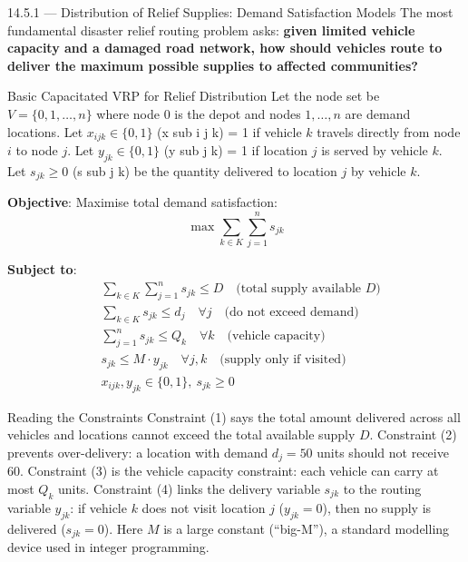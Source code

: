 \documentclass[aspectratio=169,10pt]{beamer}
\begin{document}
\begin{frame}[allowframebreaks]{14.5.1 --- Distribution of Relief Supplies: Demand Satisfaction Models}
  The most fundamental disaster relief routing problem asks:
  \textbf{given limited vehicle capacity and a damaged road network,
  how should vehicles route to deliver the maximum possible supplies
  to affected communities?}

  \medskip
  \begin{block}{Basic Capacitated VRP for Relief Distribution}
    Let the node set be $V = \{0, 1, \ldots, n\}$ where node $0$ is
    the depot and nodes $1, \ldots, n$ are demand locations.
    Let $x_{ijk} \in \{0,1\}$ (x sub i j k) = 1 if vehicle $k$ travels
    directly from node $i$ to node $j$.
    Let $y_{jk} \in \{0,1\}$ (y sub j k) = 1 if location $j$ is served
    by vehicle $k$.
    Let $s_{jk} \geq 0$ (s sub j k) be the quantity delivered to
    location $j$ by vehicle $k$.

    \textbf{Objective}: Maximise total demand satisfaction:
    \[
      \max \sum_{k \in K} \sum_{j=1}^{n} s_{jk}
    \]

    \textbf{Subject to}:
    \begin{align}
      & \sum_{k \in K} \sum_{j=1}^{n} s_{jk} \leq D
        \quad \text{(total supply available $D$)} \\
      & \sum_{k \in K} s_{jk} \leq d_j \quad \forall j
        \quad \text{(do not exceed demand)} \\
      & \sum_{j=1}^{n} s_{jk} \leq Q_k \quad \forall k
        \quad \text{(vehicle capacity)} \\
      & s_{jk} \leq M \cdot y_{jk} \quad \forall j,k
        \quad \text{(supply only if visited)} \\
      & x_{ijk}, y_{jk} \in \{0,1\},\ s_{jk} \geq 0
    \end{align}
  \end{block}

  \framebreak

  \begin{alertblock}{Reading the Constraints}
    Constraint (1) says the total amount delivered across all vehicles
    and locations cannot exceed the total available supply $D$.
    Constraint (2) prevents over-delivery: a location with demand
    $d_j = 50$ units should not receive 60.
    Constraint (3) is the vehicle capacity constraint: each vehicle
    can carry at most $Q_k$ units.
    Constraint (4) links the delivery variable $s_{jk}$ to the routing
    variable $y_{jk}$: if vehicle $k$ does not visit location $j$
    ($y_{jk} = 0$), then no supply is delivered ($s_{jk} = 0$).
    Here $M$ is a large constant (``big-M''), a standard modelling
    device used in integer programming.
  \end{alertblock}


\end{frame}
\end{document}
